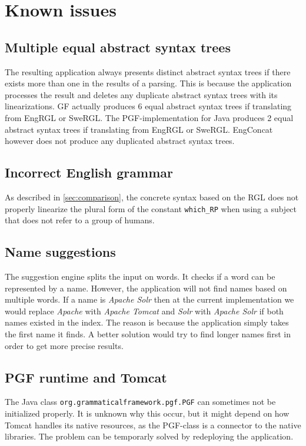 \section{Known issues}\label{sec:known-issues}
\subsection{Multiple equal abstract syntax trees}
The resulting application always presents distinct abstract syntax trees if there exists more than one in the results of a parsing. This is because the application processes the result and deletes any duplicate abstract syntax trees with its linearizations. GF actually produces 6 equal abstract syntax trees if translating from EngRGL or SweRGL. The PGF-implementation for Java produces 2 equal abstract syntax trees if translating from EngRGL or SweRGL. EngConcat however does not produce any duplicated abstract syntax trees.

\subsection{Incorrect English grammar}
As described in \autoref{sec:comparison}, the concrete syntax based on the RGL does not properly linearize the plural form of the constant \texttt{which\_RP} when using a subject that does not refer to a group of humans.

\subsection{Name suggestions}
The suggestion engine splits the input on words. It checks if a word can be represented by a name. However, the application will not find names based on multiple words. If a name is \emph{Apache Solr} then at the current implementation we would replace \emph{Apache} with \emph{Apache Tomcat} and \emph{Solr} with \emph{Apache Solr} if both names existed in the index. The reason is because the application simply takes the first name it finds. A better solution would try to find longer names first in order to get more precise results.

\subsection{PGF runtime and Tomcat }
The Java class \texttt{org.grammaticalframework.pgf.PGF} can sometimes not be initialized properly. It is unknown why this occur, but it might depend on how Tomcat handles its native resources, as the PGF-class is a connector to the native libraries. The problem can be temporarly solved by redeploying the application.

